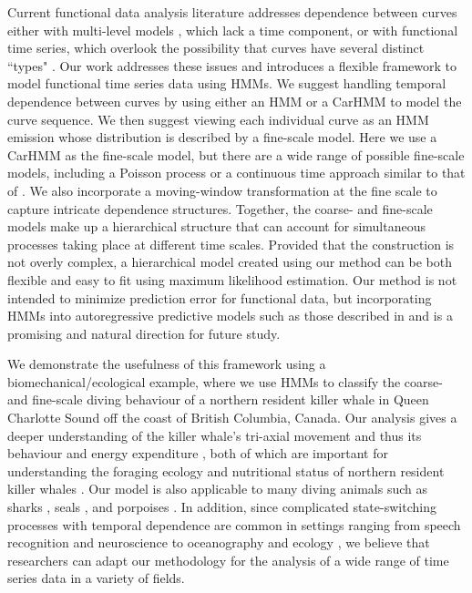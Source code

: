 

Current functional data analysis literature addresses dependence between curves either with multi-level models \citep{Di:2009,Chen:2012}, which lack a time component, or with functional time series, which overlook the possibility that curves have several distinct ``types" \citep{Kokoszka:2018}. Our work addresses these issues and introduces a flexible framework to model functional time series data using HMMs.
We suggest handling temporal dependence between curves by using either an HMM or a CarHMM to model the curve sequence. We then suggest viewing each individual curve as an HMM emission whose distribution is described by a fine-scale model. Here we use a CarHMM as the fine-scale model, but there are a wide range of possible fine-scale models, including a Poisson process or a continuous time approach similar to that of \citet{Michelot:2019}. We also incorporate a moving-window transformation at the fine scale to capture intricate dependence structures. Together, the coarse- and fine-scale models make up a hierarchical structure that can account for simultaneous processes taking place at different time scales. Provided that the construction is not overly complex, a hierarchical model created using our method can be both flexible and easy to fit using maximum likelihood estimation. Our method is not intended to minimize prediction error for functional data, but incorporating HMMs into autoregressive predictive models such as those described in \citet{Aue:2015} and \citet{Gao:2019} is a promising and natural direction for future study. 

We demonstrate the usefulness of this framework using a biomechanical/ecological example, where we use HMMs to classify the coarse- and fine-scale diving behaviour of a northern resident killer whale in Queen Charlotte Sound off the coast of British Columbia, Canada. Our analysis gives a deeper understanding of the killer whale's tri-axial movement and thus its behaviour and energy expenditure \citep{Gleiss:2011,Qasem:2012}, both of which are important for understanding the foraging ecology and nutritional status of northern resident killer whales \citep{Noren:2011}. Our model is also applicable to many diving animals such as sharks \citep{Adam:2019}, seals \citep{Dot:2016}, and porpoises \citep{Barajas:2017}. In addition, since complicated state-switching processes with temporal dependence are common in settings ranging from speech recognition \citep{Juang:1991} and neuroscience \citep{Langrock:2013} to oceanography \citep{Bulla:2012} and ecology \citep{Adam:2019}, we believe that researchers can adapt our methodology for the analysis of a wide range of time series data in a variety of fields.